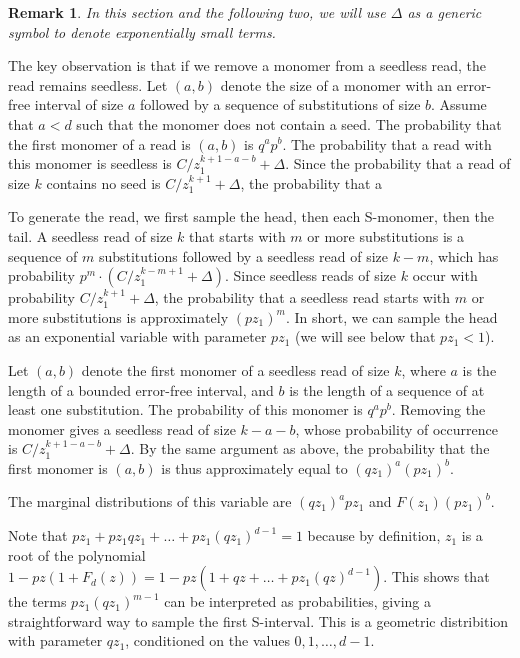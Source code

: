\documentclass{article}
\newtheorem{remark}{Remark}
\begin{document}
\begin{remark}
In this section and the following two, we will use $\Delta$ as a generic
symbol to denote exponentially small terms.
\end{remark}

The key observation is that if we remove a monomer from a seedless read,
the read remains seedless. Let $(a,b)$ denote the size of a monomer with
an error-free interval of size $a$ followed by a sequence of substitutions
of size $b$. Assume that $a < d$ such that the monomer does not contain a
seed. The probability that the first monomer of a read is $(a,b)$ is
$q^ap^b$. The probability that a read with this monomer is seedless is
$C/z_1^{k+1-a-b} + \Delta$. Since the probability that a read of size $k$
contains no seed is $C/z_1^{k+1} + \Delta$, the probability that a 

To generate the read, we first sample the head, then each S-monomer, then
the tail. A seedless read of size $k$ that starts with $m$ or more
substitutions is a sequence of $m$ substitutions followed by a seedless
read of size $k-m$, which has probability $p^m \cdot (C/z_1^{k-m+1} +
\Delta)$. Since seedless reads of size $k$ occur with probability
$C/z_1^{k+1} + \Delta$, the probability that a seedless read starts with
$m$ or more substitutions is approximately $(pz_1)^m$. In short, we can
sample the head as an exponential variable with parameter $pz_1$ (we
will see below that $pz_1 < 1$).

Let $(a,b)$ denote the first monomer of a seedless read of size $k$, where
$a$ is the length of a bounded error-free interval, and $b$ is the length
of a sequence of at least one substitution. The probability of this
monomer is $q^ap^b$. Removing the monomer gives a seedless read of size
$k-a-b$, whose probability of occurrence is $C/z_1^{k+1-a-b}+\Delta$. By
the same argument as above, the probability that the first monomer is
$(a,b)$ is thus approximately equal to $(qz_1)^a(pz_1)^b$.

The marginal distributions of this variable are $(qz_1)^apz_1$ and
$F(z_1)(pz_1)^b$.

Note that $pz_1 + pz_1qz_1 + \ldots + pz_1(qz_1)^{d-1} = 1$ because by
definition, $z_1$ is a root of the polynomial $1-pz(1+F_d(z)) =
1-pz(1+qz+\ldots+pz_1(qz)^{d-1})$. This shows that the terms
$pz_1(qz_1)^{m-1}$ can be interpreted as probabilities, giving a
straightforward way to sample the first S-interval. This is a
geometric distribition with parameter $qz_1$, conditioned on the values
$0, 1, \ldots, d-1$.
\end{document}
